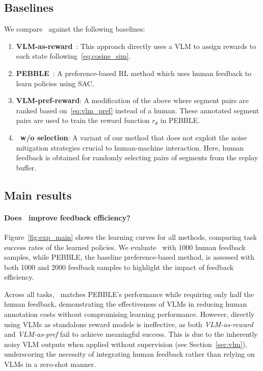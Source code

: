 \subsection{Baselines} \label{sec:exp_baseline}
We compare \algo~against the following baselines:
\begin{enumerate}
    \item \textbf{VLM-as-reward}~\cite{rocamonde2023vision}: This approach directly uses a VLM to assign rewards to each state following~\eqref{eq:cosine_sim}.
    \item \textbf{PEBBLE}~\cite{lee2021pebble}: A preference-based RL method which uses human feedback to learn policies using SAC.
    \item \textbf{VLM-pref-reward}: A modification of the above where segment pairs are ranked based on~\eqref{eq:vlm_pref} instead of a human. 
    These annotated segment pairs are used to train the reward function $r_{\theta}$ in PEBBLE.
    \item \textbf{\algo~w/o selection}: A variant of our method that does not exploit the noise mitigation strategies crucial to human-machine interaction. 
    Here, human feedback is obtained for randomly selecting pairs of segments from the replay buffer. 
\end{enumerate}


\subsection{Main results} \label{sec:exp_results}

\paragraph{Does \algo~improve feedback efficiency?}
Figure~\ref{fig:exp_main} shows the learning curves for all methods, comparing task success rates of the learned policies. 
We evaluate \algo~with 1000 human feedback samples, while PEBBLE, the baseline preference-based method, is assessed with both 1000 and 2000 feedback samples to highlight the impact of feedback efficiency. 

Across all tasks, \algo~matches PEBBLE's performance while requiring only half the human feedback, demonstrating the effectiveness of VLMs in reducing human annotation costs without compromising learning performance. 
However, directly using VLMs as standalone reward models is ineffective, as both \textit{VLM-as-reward} and \textit{VLM-as-pref} fail to achieve meaningful success. 
This is due to the inherently noisy VLM outputs when applied without supervision (see Section~\ref{sec:vlm}), underscoring the necessity of integrating human feedback rather than relying on VLMs in a zero-shot manner. 

